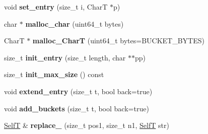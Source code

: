 \begin{CompactItemize}
\item 
\hypertarget{classdeque__string_7ba6a54fa3737cdb0dfc7062a3b282a6}{
void \textbf{set\_\-entry} (size\_\-t i, CharT $\ast$p)}
\label{classdeque__string_7ba6a54fa3737cdb0dfc7062a3b282a6}

\item 
\hypertarget{classdeque__string_5c8eb4fbfe7f7b6435bbaa5736b0fc4a}{
char $\ast$ \textbf{malloc\_\-char} (uint64\_\-t bytes)}
\label{classdeque__string_5c8eb4fbfe7f7b6435bbaa5736b0fc4a}

\item 
\hypertarget{classdeque__string_420ba40857a5c23f1e76959aae920310}{
CharT $\ast$ \textbf{malloc\_\-CharT} (uint64\_\-t bytes=BUCKET\_\-BYTES)}
\label{classdeque__string_420ba40857a5c23f1e76959aae920310}

\item 
\hypertarget{classdeque__string_8770e448987798a03436973f93f3e986}{
size\_\-t \textbf{init\_\-entry} (size\_\-t length, char $\ast$$\ast$pp)}
\label{classdeque__string_8770e448987798a03436973f93f3e986}

\item 
\hypertarget{classdeque__string_69825b493a8263b7be10dee4e5f01deb}{
size\_\-t \textbf{init\_\-max\_\-size} () const }
\label{classdeque__string_69825b493a8263b7be10dee4e5f01deb}

\item 
\hypertarget{classdeque__string_d45388c227fa99b6c378f23b45d0057c}{
void \textbf{extend\_\-entry} (size\_\-t t, bool back=true)}
\label{classdeque__string_d45388c227fa99b6c378f23b45d0057c}

\item 
\hypertarget{classdeque__string_b2959198ac62159050c756e8635f54f2}{
void \textbf{add\_\-buckets} (size\_\-t t, bool back=true)}
\label{classdeque__string_b2959198ac62159050c756e8635f54f2}

\item 
\hypertarget{classdeque__string_2270d650b124459cfa360b51fa996aff}{
\hyperlink{classdeque__string}{SelfT} \& \textbf{replace\_\-} (size\_\-t pos1, size\_\-t n1, \hyperlink{classdeque__string}{SelfT} str)}
\label{classdeque__string_2270d650b124459cfa360b51fa996aff}

\end{CompactItemize}
